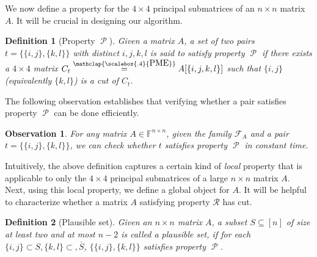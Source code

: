 \documentclass[11pt,letterpaper]{article}
\newcommand{\comp}[1]{\overline{#1}}
\newcommand{\F}{\mathbb{F}}
\newtheorem{observation}{Observation}[section]
\newtheorem{definition}{Definition}[section]
\DeclareMathOperator{\calP}{\mathcal{P}}
\newcommand{\PME}{\stackrel{\mathclap{\scalebox{.4}{\mbox{PME}}}}{=}}
\newcommand{\prop}{\mathcal{R}}
\newcommand{\submatrixfamily}[1]{\mathcal{F}_{#1}}
\begin{document}
{{{We now define a property for the $4\times 4$ principal submatrices of an $n \times n$ matrix $A$. It will be crucial in designing our algorithm.
\begin{definition}[Property $\calP$]
\label{def:property-P}
    Given a matrix $A$, a set of two pairs $t=\{\{i,j\},\{k,l\}\}$ with distinct $i,j,k,l$ is said to satisfy property $\calP$ if there exists a $4\times 4$ matrix $C_t\PME A[\{i,j,k,l\}]$ such that $\{i,j\}$ (equivalently $\{k,l\}$) is a cut of $C_t$. 
\end{definition}

The following observation establishes that verifying whether a pair satisfies property $\calP$ can be done efficiently. 
\begin{observation}
\label{obs:checkP} 
For any matrix $A\in\F^{n\times n}$, given the family $\submatrixfamily{A}$ and a pair $t=\{\{i, j\}, \{k, l\}\}$, we can check whether $t$ satisfies property $\calP$ in constant time.
\end{observation}

Intuitively, the above definition captures a certain kind of \emph{local} property that is applicable to only the $4\times 4$ principal submatrices of a large $n\times n$ matrix $A$. Next, using this local property, we define a global object for $A$. It will be helpful to characterize whether a matrix $A$ satisfying property $\prop$ has cut.
\begin{definition}[Plausible set]
\label{def:plausibleSet}
Given an $n \times n$ matrix $A$, a subset $S\subseteq [n]$ of size at least two and at most $n-2$ is called a \emph{plausible set}, if for each $\{i,j\}\subset S, \{k,l\}\subset, \comp{S}$, $\{\{i,j\},\{k,l\}\}$ satisfies property $\calP$.
\end{definition}


}}}
\end{document}
